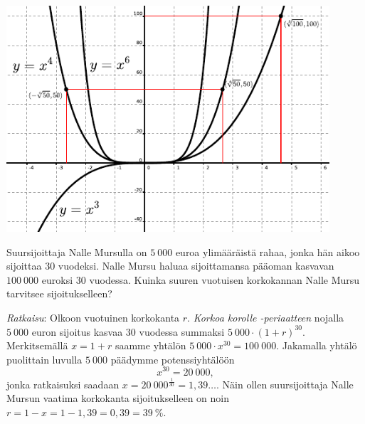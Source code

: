 \begin{esimerkki}
\begin{alakohdat}
\end{alakohdat}

\begin{center}
\includegraphics[width=12cm]{pictures/xpot346.pdf}
\end{center}
\end{esimerkki}


\begin{esimerkki}
Suursijoittaja Nalle Mursulla on $5~000$ euroa ylimääräistä rahaa, jonka hän aikoo sijoittaa $30$ vuodeksi.  Nalle Mursu haluaa sijoittamansa pääoman kasvavan $100~000$ euroksi $30$ vuodessa.  Kuinka suuren vuotuisen korkokannan Nalle Mursu tarvitsee sijoitukselleen? 

\emph{Ratkaisu}:  Olkoon vuotuinen korkokanta $r$. \emph{Korkoa korolle -periaatteen} nojalla $5~000$ euron sijoitus kasvaa $30$ vuodessa summaksi $5~000\cdot(1+r)^{30}$.  Merkitsemällä $x=1+r$ saamme yhtälön $5~000\cdot x^{30} = 100~000$.  Jakamalla yhtälö puolittain luvulla $5~000$ päädymme 
potenssiyhtälöön 
$$
x^{30} = 20~000,
$$ 
jonka ratkaisuksi saadaan $x=20~000^{\frac{1}{30}} = 1{,}39\ldots$. Näin
ollen suursijoittaja Nalle Mursun vaatima korkokanta sijoitukselleen on noin $r=1-x=1-1,39=0,39=39~\%$.
\end{esimerkki}


